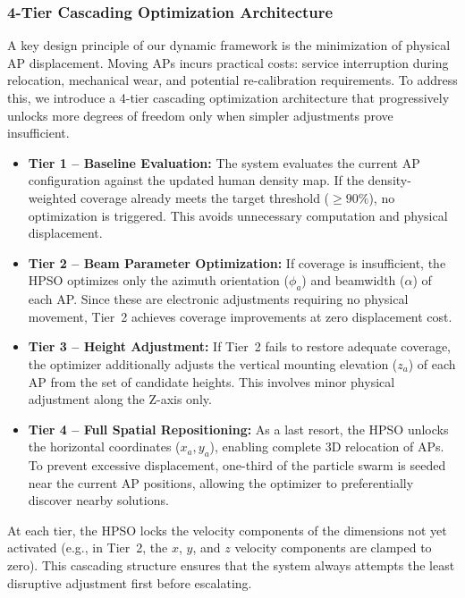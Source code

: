 \documentclass[conference]{IEEEtran}
\begin{document}
\subsubsection{4-Tier Cascading Optimization Architecture}

A key design principle of our dynamic framework is the minimization of physical AP displacement. Moving APs incurs practical costs: service interruption during relocation, mechanical wear, and potential re-calibration requirements. To address this, we introduce a 4-tier cascading optimization architecture that progressively unlocks more degrees of freedom only when simpler adjustments prove insufficient.

\begin{itemize}
    \item \textbf{Tier 1 -- Baseline Evaluation:} The system evaluates the current AP configuration against the updated human density map. If the density-weighted coverage already meets the target threshold ($\ge 90\%$), no optimization is triggered. This avoids unnecessary computation and physical displacement.

    \item \textbf{Tier 2 -- Beam Parameter Optimization:} If coverage is insufficient, the HPSO optimizes only the azimuth orientation ($\phi_a$) and beamwidth ($\alpha$) of each AP. Since these are electronic adjustments requiring no physical movement, Tier~2 achieves coverage improvements at zero displacement cost.

      \item \textbf{Tier 3 -- Height Adjustment:} If Tier~2 fails to restore adequate coverage, the optimizer additionally adjusts the vertical mounting elevation ($z_a$) of each AP from the set of candidate heights. This involves minor physical adjustment along the Z-axis only.

    \item \textbf{Tier 4 -- Full Spatial Repositioning:} As a last resort, the HPSO unlocks the horizontal coordinates ($x_a, y_a$), enabling complete 3D relocation of APs. To prevent excessive displacement, one-third of the particle swarm is seeded near the current AP positions, allowing the optimizer to preferentially discover nearby solutions.
\end{itemize}

At each tier, the HPSO locks the velocity components of the dimensions not yet activated (e.g., in Tier~2, the $x$, $y$, and $z$ velocity components are clamped to zero). This cascading structure ensures that the system always attempts the least disruptive adjustment first before escalating.
\end{document}
